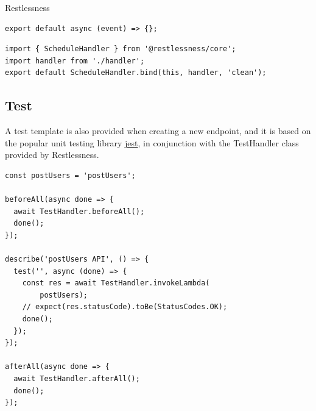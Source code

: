\begin{chapter}{Restlessness}
    \bigskip
    \begin{lstlisting}[caption=handler.ts content, label={lst:sched_handler_ts}]
export default async (event) => {};
    \end{lstlisting}

    \bigskip
    \begin{lstlisting}[caption=index.ts content, label={lst:sched_index_ts}]
import { ScheduleHandler } from '@restlessness/core';
import handler from './handler';
export default ScheduleHandler.bind(this, handler, 'clean');
    \end{lstlisting}

    \subsection{Test}
    A test template is also provided when creating a new endpoint, and it is based
    on the popular unit testing library \href{https://jestjs.io/}{jest}, in
    conjunction with the TestHandler class provided by Restlessness.

    \bigskip
    \begin{lstlisting}[caption=index.test.ts template, label={lst:endopints_test_ts}]
const postUsers = 'postUsers';

beforeAll(async done => {
  await TestHandler.beforeAll();
  done();
});

describe('postUsers API', () => {
  test('', async (done) => {
    const res = await TestHandler.invokeLambda(
        postUsers);
    // expect(res.statusCode).toBe(StatusCodes.OK);
    done();
  });
});

afterAll(async done => {
  await TestHandler.afterAll();
  done();
});
    \end{lstlisting}

\end{chapter}